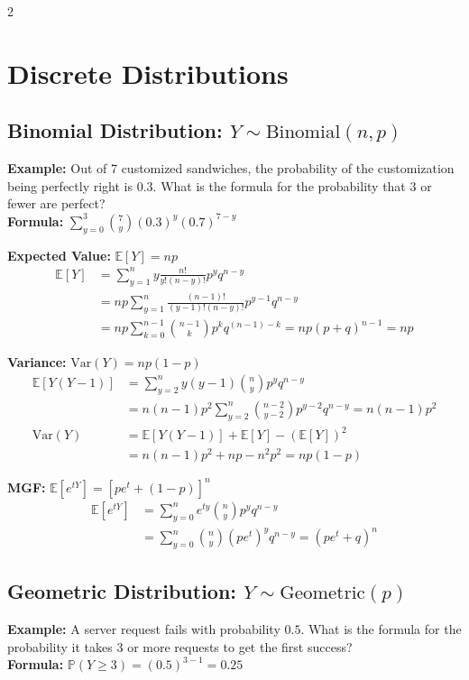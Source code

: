 \documentclass[11pt, letterpaper]{article}
\theoremstyle{definition}
\theoremstyle{remark}
\newcommand{\E}{\mathbb{E}}
\newcommand{\Prob}{\mathbb{P}}
\begin{document}
\begin{multicols*}{2}

\section{Discrete Distributions}

\subsection{Binomial Distribution: $Y \sim \text{Binomial}(n, p)$}
\textbf{Example:} Out of 7 customized sandwiches, the probability of the customization being perfectly right is $0.3$. What is the formula for the probability that 3 or fewer are perfect? \\
\textbf{Formula:} $\sum_{y=0}^{3} \binom{7}{y} (0.3)^y (0.7)^{7-y}$

\textbf{Expected Value:} $\E[Y] = np$
\begin{align*}
\E[Y] &= \sum_{y=1}^{n} y \frac{n!}{y!(n-y)!} p^y q^{n-y} \\
&= np \sum_{y=1}^{n} \frac{(n-1)!}{(y-1)!(n-y)!} p^{y-1} q^{n-y} \\
&= np \sum_{k=0}^{n-1} \binom{n-1}{k} p^k q^{(n-1)-k} = np(p+q)^{n-1} = np
\end{align*}

\textbf{Variance:} $\text{Var}(Y) = np(1-p)$
\begin{align*}
\E[Y(Y-1)] &= \sum_{y=2}^{n} y(y-1) \binom{n}{y} p^y q^{n-y} \\
&= n(n-1)p^2 \sum_{y=2}^{n} \binom{n-2}{y-2} p^{y-2} q^{n-y} = n(n-1)p^2 \\
\text{Var}(Y) &= \E[Y(Y-1)] + \E[Y] - (\E[Y])^2 \\
&= n(n-1)p^2 + np - n^2p^2 = np(1-p)
\end{align*}

\textbf{MGF:} $\E[e^{tY}] = [pe^t + (1-p)]^n$
\begin{align*}
\E[e^{tY}] &= \sum_{y=0}^{n} e^{ty} \binom{n}{y} p^y q^{n-y} \\
&= \sum_{y=0}^{n} \binom{n}{y} (pe^t)^y q^{n-y} = (pe^t + q)^n
\end{align*}

\subsection{Geometric Distribution: $Y \sim \text{Geometric}(p)$}
\textbf{Example:} A server request fails with probability $0.5$. What is the formula for the probability it takes 3 or more requests to get the first success? \\
\textbf{Formula:} $\Prob(Y \ge 3) = (0.5)^{3-1} = 0.25$


\end{multicols*}
\end{document}
